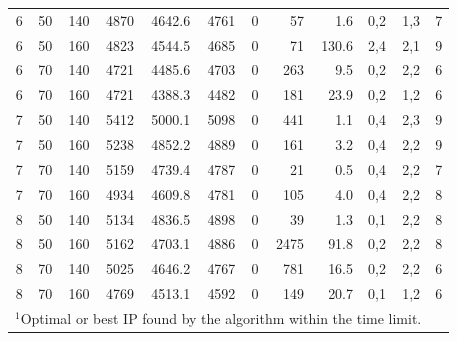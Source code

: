 \documentclass[11pt]{article}
\begin{document}
\begin{table}[h!tbp]
{\begin {tabular}[t]{|c|c|c|c|c|c|c|r|r|c|c|c|}
6 & 50	& 140	& 4870	& 4642.6 &	4761	&	0	&	57	& 1.6	& 0,2	&	1,3	& 7	\\
6 & 50	& 160	& 4823	& 4544.5 &	4685	&	0	&	71	& 130.6	& 2,4	&	2,1	& 9	\\
6 & 70	& 140	& 4721	& 4485.6 &	4703	&	0	&	263	& 9.5	& 0,2	&	2,2	& 6	\\
6 & 70	& 160	& 4721	& 4388.3 &	4482	&	0	&	181	& 23.9	& 0,2	&	1,2	& 6	\\\hline
7 & 50	& 140	& 5412	& 5000.1 &	5098	&	0	&	441	& 1.1	& 0,4	&	2,3	& 9	\\
7 & 50	& 160	& 5238	& 4852.2 &	4889	&	0	&	161	& 3.2	& 0,4	&	2,2	& 9	\\
7 & 70	& 140	& 5159	& 4739.4 &	4787	&	0	&	21	& 0.5	& 0,4	&	2,2	& 7	\\
7 & 70	& 160	& 4934	& 4609.8 &	4781	&	0	&	105	& 4.0	& 0,4	&	2,2	& 8	\\\hline
8 & 50	& 140	& 5134	& 4836.5 &	4898	&	0	&	39	& 1.3	& 0,1	&	2,2	& 8	\\
8 & 50	& 160	& 5162	& 4703.1 &	4886	&	0	&	2475	& 91.8	& 0,2	&	2,2	& 8	\\
8 & 70	& 140	& 5025	& 4646.2 &	4767	&	0	&	781	& 16.5	& 0,2	&	2,2	& 6	\\
8 & 70	& 160	& 4769	& 4513.1 &	4592	&	0	&	149	& 20.7	& 0,1	&	1,2	& 6	\\\hline
\multicolumn{11}{l}{$^1$Optimal or best IP found by the algorithm within the time limit.}\\
\end{tabular}}
\end{table} 

\end{document}
